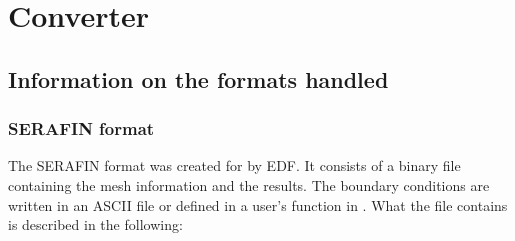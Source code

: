 \chapter{Converter}
\section{Information on the formats handled}

\subsection{SERAFIN format}

The SERAFIN format was created for \telemacsystem by EDF. It consists of a binary file
containing the mesh information and the results.  The boundary conditions are
written in an ASCII file or defined in a user's function in \telemacsystem.  What the
file contains is described in the following:


